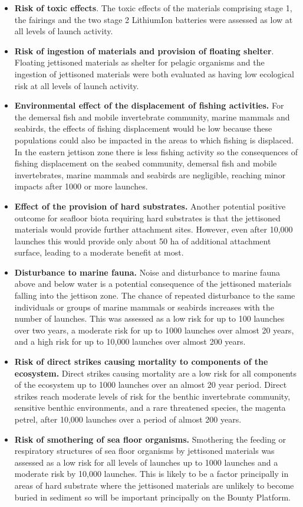\begin{itemize}
\item \textbf{Risk of toxic effects}. The toxic effects of the materials comprising stage 1, the fairings and the two stage 2 LithiumIon batteries were assessed as low at all levels of launch activity.
\item \textbf{Risk of ingestion of materials and provision of floating shelter}. Floating jettisoned materials as shelter for pelagic organisms and the ingestion of jettisoned materials were both evaluated as having low ecological risk at all levels of launch activity.
\item \textbf{Environmental effect of the displacement of fishing activities.} For the demersal fish
and mobile invertebrate community, marine mammals and seabirds, the effects of fishing displacement would be low because these populations could also be impacted in the areas to which fishing is displaced. In the eastern jettison zone there is less fishing activity so the consequences of fishing displacement on the seabed community, demersal fish and mobile invertebrates, marine mammals and seabirds are negligible, reaching minor impacts after 1000 or more launches.
\item \textbf{Effect of the provision of hard substrates.} Another potential positive outcome for seafloor biota requiring hard substrates is that the jettisoned materials would provide further attachment sites. However, even after 10,000 launches this would provide only about 50 ha of additional attachment surface, leading to a moderate benefit at most.
\item \textbf{Disturbance to marine fauna.} Noise and disturbance to marine fauna above and below water is a potential consequence of
the jettisoned materials falling into the jettison zone. The chance of repeated disturbance to the same individuals or groups of marine mammals or seabirds increases with the number of launches. This was assessed as a low risk for up to 100 launches over two years, a moderate risk for up to 1000 launches over almost 20 years, and a high risk for up to 10,000 launches over almost 200 years.
\item \textbf{Risk of direct strikes causing mortality to components of the ecosystem.} Direct strikes causing mortality are a low risk for all components of the ecosystem up to 1000 launches over an almost 20 year period. Direct strikes reach moderate levels of risk for the benthic invertebrate community, sensitive benthic environments, and a rare threatened species, the magenta petrel, after 10,000 launches over a period of almost 200 years.
\item \textbf{Risk of smothering of sea floor organisms.} Smothering the feeding or respiratory structures of sea floor organisms by jettisoned materials was assessed as a low risk for all levels of launches up to 1000 launches and a moderate risk by 10,000 launches. This is likely to be a factor principally in areas of hard substrate where the jettisoned materials are unlikely to become buried in sediment so will be important principally on the Bounty Platform.
\end{itemize}

